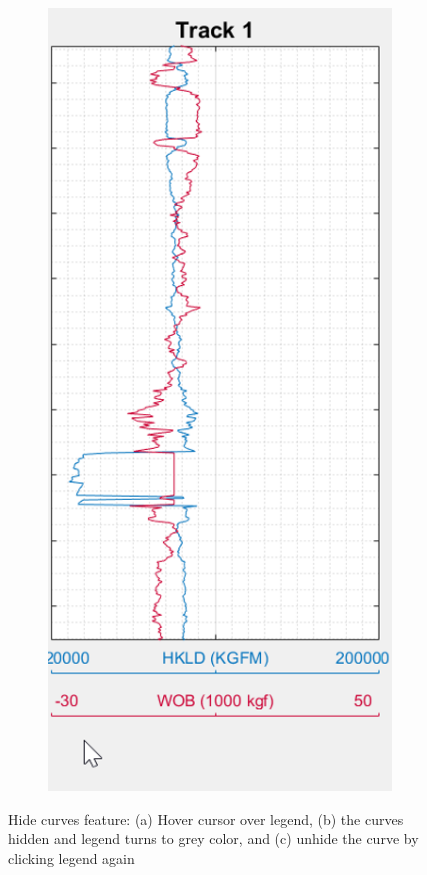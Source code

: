 \documentclass[12pt,a4paper,oneside]{report}
\begin{document}
\begin{figure}[H]
\begin{subfigure}[b]{0.31\textwidth}
    \caption{}
    \label{fig:f2}
  \end{subfigure}
   \hfill
  \begin{subfigure}[b]{0.31\textwidth}
    \includegraphics[width=\textwidth]{3_hide.png}
    \caption{}
    \label{fig:f2}
  \end{subfigure}
  \caption{Hide curves feature: (a) Hover cursor over legend, (b) the curves hidden and legend turns to grey color, and (c) unhide the curve by clicking legend again}
  
\end{figure}
\end{document}
